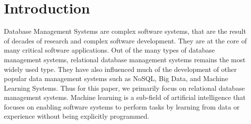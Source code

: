 \section{Introduction}

Database Management Systems are complex software systems, that are the result of decades of research and complex software development.
They are at the core of many critical software applications.
Out of the many types of database management systems, relational database management systems remains the most widely used type.
They have also influenced much of the development of other popular data management systems such as NoSQL, Big Data, and Machine Learning Systems.
Thus for this paper, we primarily focus on relational database management systems.
Machine learning is a sub-field of artificial intelligence that focuses on enabling software systems to perform tasks by learning from data or experience without being explicitly programmed.

